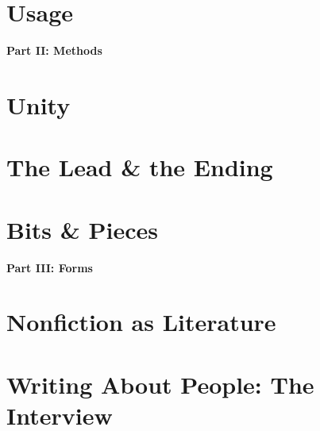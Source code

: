 \documentclass{article}
\numberwithin{equation}{section}
\begin{document}

\section{Usage}


\begin{center}\LARGE\sf
	\textbf{Part II: Methods}
\end{center}

\section{Unity}


\section{The Lead \& the Ending}


\section{Bits \& Pieces}


\begin{center}\LARGE\sf
	\textbf{Part III: Forms}
\end{center}

\section{Nonfiction as Literature}


\section{Writing About People: The Interview}

\end{document}
